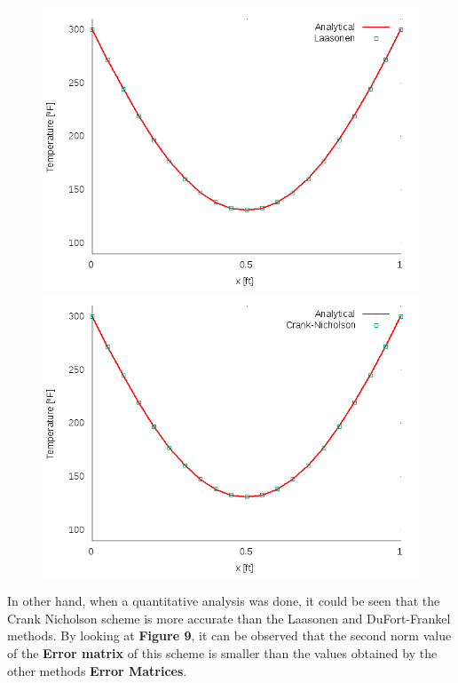 \documentclass[12pt]{report}
\begin{document}
\begin{figure}[!htb]
\centering
\begin{minipage}{.5\textwidth}
  \centering
  \includegraphics[width=.8\linewidth]{Laasonent_0_4dt_0_010.png}
\end{minipage}%
\begin{minipage}{.5\textwidth}
  \centering
  \includegraphics[width=.8\linewidth]{Crank-Nicholsont_0_4.png}
\end{minipage}
\end{figure}

\par In other hand, when a quantitative analysis was done, it could be seen that the Crank Nicholson scheme is more accurate than the Laasonen and DuFort-Frankel methods. By looking at \textbf{Figure 9}, it can be observed that the second norm value of the \textbf{Error matrix} of this scheme is smaller than the values obtained by the other methods \textbf{Error Matrices}.
\end{document}
